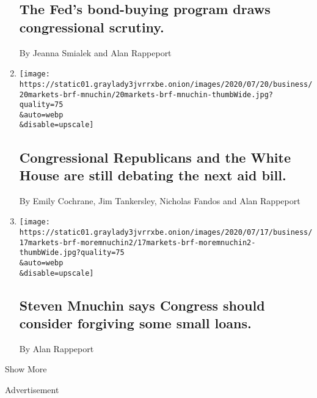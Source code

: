 \begin{enumerate}
  \hypertarget{the-feds-bond-buying-program-draws-congressional-scrutiny}{%
  \subsection{The Fed's bond-buying program draws congressional
  scrutiny.}\label{the-feds-bond-buying-program-draws-congressional-scrutiny}}

  By Jeanna Smialek and Alan Rappeport
\item
  \href{/live/2020/07/20/business/stock-market-today-coronavirus/congressional-republicans-and-the-white-house-are-still-debating-the-next-aid-bill}{}

  \texttt{[image: https://static01.graylady3jvrrxbe.onion/images/2020/07/20/business/20markets-brf-mnuchin/20markets-brf-mnuchin-thumbWide.jpg?quality=75\\\&auto=webp\\\&disable=upscale]}

  \hypertarget{congressional-republicans-and-the-white-house-are-still-debating-the-next-aid-bill}{%
  \subsection{Congressional Republicans and the White House are still
  debating the next aid
  bill.}\label{congressional-republicans-and-the-white-house-are-still-debating-the-next-aid-bill}}

  By Emily Cochrane, Jim Tankersley, Nicholas Fandos and Alan Rappeport
\item
  \href{/live/2020/07/17/business/stock-market-today-coronavirus/steven-mnuchin-says-congress-should-consider-forgiving-some-small-loans}{}

  \texttt{[image: https://static01.graylady3jvrrxbe.onion/images/2020/07/17/business/17markets-brf-moremnuchin2/17markets-brf-moremnuchin2-thumbWide.jpg?quality=75\\\&auto=webp\\\&disable=upscale]}

  \hypertarget{steven-mnuchin-says-congress-should-consider-forgiving-some-small-loans}{%
  \subsection{Steven Mnuchin says Congress should consider forgiving
  some small
  loans.}\label{steven-mnuchin-says-congress-should-consider-forgiving-some-small-loans}}

  By Alan Rappeport
\end{enumerate}

Show More

Advertisement

